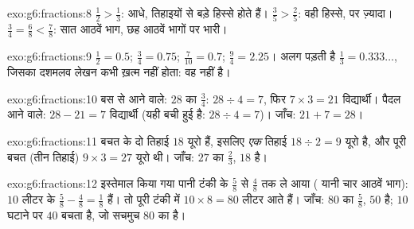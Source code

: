 \begin{solution}{exo:g6:fractions:8}
$\frac12 > \frac13$: आधे, तिहाइयों से बड़े हिस्से होते हैं।
$\frac35 > \frac25$: वही हिस्से, पर ज़्यादा।
$\frac34 = \frac68 < \frac78$: सात आठवें भाग, छह आठवें भागों पर भारी।
\end{solution}

\begin{solution}{exo:g6:fractions:9}
$\frac12 = 0.5$; \quad $\frac34 = 0.75$; \quad
$\frac{7}{10} = 0.7$; \quad $\frac94 = 2.25$। अलग पड़ती है
$\frac13 = 0.333\dots$, जिसका दशमलव लेखन कभी ख़त्म नहीं होता: वह
 नहीं है।
\end{solution}

\begin{solution}{exo:g6:fractions:10}
बस से आने वाले: $28$ का $\frac34$: $28 \div 4 = 7$, फिर
$7 \times 3 = 21$ विद्यार्थी। पैदल आने वाले: $28 - 21 = 7$
विद्यार्थी (यही बची हुई  है: $28 \div 4 = 7$)। जाँच: $21 + 7 = 28$।
\end{solution}

\begin{solution}{exo:g6:fractions:11}
बचत के दो तिहाई $18$ यूरो हैं, इसलिए \emph{एक} तिहाई
$18 \div 2 = 9$ यूरो है, और पूरी बचत (तीन तिहाई)
$9 \times 3 = 27$ यूरो थी। जाँच: $27$ का $\frac23$, $18$ है।
\end{solution}

\begin{solution}{exo:g6:fractions:12}
इस्तेमाल किया गया पानी टंकी के $\frac58$ से $\frac48$ तक ले आया
( यानी चार आठवें भाग): $10$ लीटर  के
$\frac58 - \frac48 = \frac18$ हैं। तो पूरी टंकी में
$10 \times 8 = 80$ लीटर आते हैं। जाँच: $80$ का $\frac58$, $50$ है;
$10$ घटाने पर $40$ बचता है, जो सचमुच $80$ का  है।
\end{solution}

